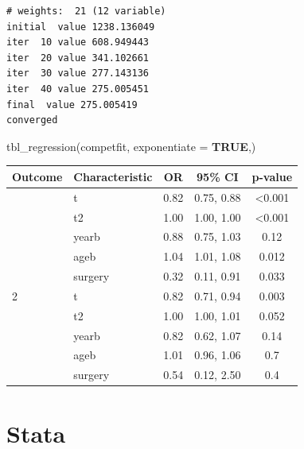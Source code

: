 \documentclass[
  12pt,
  letterpaper,
  DIV=11,
  numbers=noendperiod,
  onepage,
  openany]{scrreprt}
\newenvironment{Shaded}{\begin{snugshade}}{\end{snugshade}}
\newcommand{\AttributeTok}[1]{\textcolor[rgb]{0.80,0.80,0.80}{#1}}
\newcommand{\ConstantTok}[1]{\textcolor[rgb]{0.86,0.64,0.64}{\textbf{#1}}}
\newcommand{\FunctionTok}[1]{\textcolor[rgb]{0.94,0.94,0.56}{#1}}
\newcommand{\NormalTok}[1]{\textcolor[rgb]{0.80,0.80,0.80}{#1}}
\begin{document}
\begin{verbatim}
# weights:  21 (12 variable)
initial  value 1238.136049 
iter  10 value 608.949443
iter  20 value 341.102661
iter  30 value 277.143136
iter  40 value 275.005451
final  value 275.005419 
converged
\end{verbatim}

\begin{Shaded}
\begin{Highlighting}[]
\FunctionTok{tbl\_regression}\NormalTok{(competfit, }\AttributeTok{exponentiate =} \ConstantTok{TRUE}\NormalTok{,)}
\end{Highlighting}
\end{Shaded}

\begin{longtable}[]{@{}llccc@{}}
\toprule\noalign{}
\textbf{Outcome} & \textbf{Characteristic} & \textbf{OR} & \textbf{95\%
CI} & \textbf{p-value} \\
\midrule\noalign{}
\endhead
\bottomrule\noalign{}
\endlastfoot
1 & t & 0.82 & 0.75, 0.88 & \textless0.001 \\
& t2 & 1.00 & 1.00, 1.00 & \textless0.001 \\
& yearb & 0.88 & 0.75, 1.03 & 0.12 \\
& ageb & 1.04 & 1.01, 1.08 & 0.012 \\
& surgery & 0.32 & 0.11, 0.91 & 0.033 \\
2 & t & 0.82 & 0.71, 0.94 & 0.003 \\
& t2 & 1.00 & 1.00, 1.01 & 0.052 \\
& yearb & 0.82 & 0.62, 1.07 & 0.14 \\
& ageb & 1.01 & 0.96, 1.06 & 0.7 \\
& surgery & 0.54 & 0.12, 2.50 & 0.4 \\
\end{longtable}

\hypertarget{stata-6}{%
\chapter{\texorpdfstring{\textbf{Stata}}{Stata}}\label{stata-6}}
\end{document}
